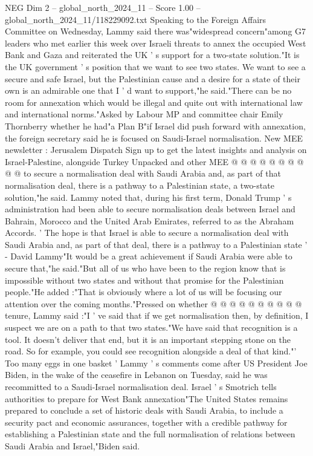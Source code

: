 \begin{textsample}{NEG Dim 2 – global\_north\_2024\_11 – Score 1.00 – global\_north\_2024\_11/118229092.txt}  \label{ex:f2_neg_185}
Speaking to the Foreign Affairs Committee on Wednesday, Lammy said there was"widespread concern"among G7 leaders who met earlier this week over Israeli threats to annex the occupied West Bank and Gaza and reiterated the UK ' s support for a two-state solution."It is the UK government ' s position that we want to see two states.
We want to see a secure and safe Israel, but the Palestinian cause and a desire for a state of their own is an admirable one that I ' d want to support,"he said."There can be no room for annexation which would be illegal and quite out with international law and international norms."Asked by Labour MP and committee chair Emily Thornberry whether he had"a Plan B"if Israel did push forward with annexation, the foreign secretary said he is focused on Saudi-Israel normalisation.
New MEE newsletter : Jerusalem Dispatch Sign up to get the latest insights and analysis on Israel-Palestine, alongside Turkey Unpacked and other MEE @ @ @ @ @ @ @ @ @ @ to secure a normalisation deal with Saudi Arabia and, as part of that normalisation deal, there is a pathway to a Palestinian state, a two-state solution,"he said.
Lammy noted that, during his first term, Donald Trump ' s administration had been able to secure normalisation deals between Israel and Bahrain, Morocco and the United Arab Emirates, referred to as the Abraham Accords. ' The hope is that Israel is able to secure a normalisation deal with Saudi Arabia and, as part of that deal, there is a pathway to a Palestinian state ' - David Lammy"It would be a great achievement if Saudi Arabia were able to secure that,"he said."But all of us who have been to the region know that is impossible without two states and without that promise for the Palestinian people."He added :"That is obviously where a lot of us will be focusing our attention over the coming months."Pressed on whether @ @ @ @ @ @ @ @ @ @ tenure, Lammy said :"I ' ve said that if we get normalisation then, by definition, I suspect we are on a path to that two states."We have said that recognition is a tool.
It doesn't deliver that end, but it is an important stepping stone on the road.
So for example, you could see recognition alongside a deal of that kind."' Too many eggs in one basket ' Lammy ' s comments come after US President Joe Biden, in the wake of the ceasefire in Lebanon on Tuesday, said he was recommitted to a Saudi-Israel normalisation deal.
Israel ' s Smotrich tells authorities to prepare for West Bank annexation"The United States remains prepared to conclude a set of historic deals with Saudi Arabia, to include a security pact and economic assurances, together with a credible pathway for establishing a Palestinian state and the full normalisation of relations between Saudi Arabia and Israel,"Biden said.

\end{textsample}
